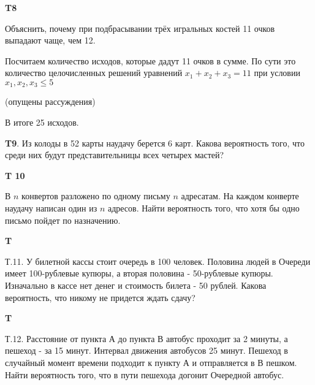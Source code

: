 \documentclass[a4paper,12pt]{article} %
\begin{document}
\begin{example}\textbf{T8}

Объяснить, почему при подбрасывании трёх игральных костей 11 очков выпадают чаще, чем 12.


Посчитаем количество исходов, которые дадут 11 очков в сумме. По сути это количество целочисленных решений уравнений $ x_1+x_2+x_3=11$ при условии $ x_1,x_2,x_3\le 5 $



(опущены рассуждения)


В итоге 25 исходов.


\end{example}




\begin{example}\textbf{T9}. Из колоды в 52 карты наудачу берется 6 карт. Какова вероятность того, что среди них будут представительницы всех четырех мастей?

\end{example}


\begin{example}\textbf{T 10}

В $n$ конвертов разложено по одному письму $n$ адресатам. 
На каждом конверте наудачу написан один из $n$ адресов. 
Найти вероятность того, что хотя бы одно письмо пойдет по назначению.




\end{example}






\begin{example}\textbf{T}

Т.11. У билетной кассы стоит очередь в 100 человек. Половина людей в
Очереди имеет 100-рублевые купюры, а вторая половина - 50-рублевые купюры. Изначально в кассе нет денег и стоимость билета - 50 рублей. Какова вероятность, что никому не придется ждать сдачу?


\end{example}


\begin{example}\textbf{T}

Т.12. Расстояние от пункта А до пункта В автобус проходит за 2 минуты, а пешеход - за 15 минут. Интервал движения автобусов 25 минут. Пешеход в случайный момент времени подходит к пункту А и отправляется в В пешком. Найти вероятность того, что в пути пешехода догонит
Очередной автобус.


\end{example}
\end{document}
